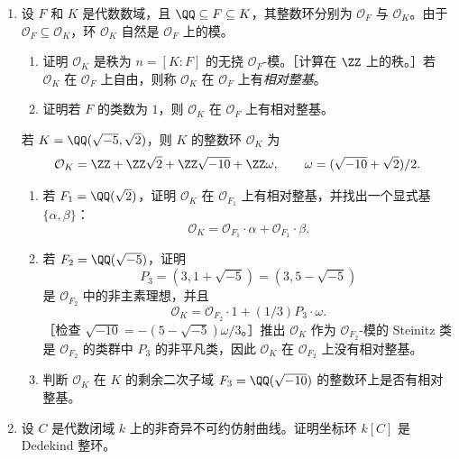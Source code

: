 \begin{enumerate}[label=\arabic*.]
\begin{enumerate}[label=(\alph*)]
    \item 证明 $\mathcal O$ 是 Bezout 整环（参见第 8.1 节）。
  \end{enumerate}
  \item 设 $F$ 和 $K$ 是代数数域，且 $\QQ\subseteq F\subseteq K$，其整数环分别为 $\mathcal O_F$ 与 $\mathcal O_K$。由于 $\mathcal O_F\subseteq\mathcal O_K$，环 $\mathcal O_K$ 自然是 $\mathcal O_F$ 上的模。
  \begin{enumerate}[label=(\alph*)]
    \item 证明 $\mathcal O_K$ 是秩为 $n=[K:F]$ 的无挠 $\mathcal O_F$-模。［计算在 $\ZZ$ 上的秩。］若 $\mathcal O_K$ 在 $\mathcal O_F$ 上自由，则称 $\mathcal O_K$ 在 $\mathcal O_F$ 上有\emph{相对整基}。
    \item 证明若 $F$ 的类数为 $1$，则 $\mathcal O_K$ 在 $\mathcal O_F$ 上有相对整基。
  \end{enumerate}
  若 $K=\QQ(\sqrt{-5},\sqrt2)$，则 $K$ 的整数环 $\mathcal O_K$ 为
  \[
    \mathcal O_K=\ZZ+\ZZ\sqrt2+\ZZ\sqrt{-10}+\ZZ\omega,
    \qquad
    \omega=(\sqrt{-10}+\sqrt2)/2.
  \]
  \begin{enumerate}[label=(\alph*),resume]
    \item 若 $F_1=\QQ(\sqrt2)$，证明 $\mathcal O_K$ 在 $\mathcal O_{F_1}$ 上有相对整基，并找出一个显式基 $\{\alpha,\beta\}$：
    \[
      \mathcal O_K=\mathcal O_{F_1}\cdot\alpha+\mathcal O_{F_1}\cdot\beta.
    \]
    \item 若 $F_2=\QQ(\sqrt{-5})$，证明
    \[
      P_3=(3,1+\sqrt{-5})=(3,5-\sqrt{-5})
    \]
    是 $\mathcal O_{F_2}$ 中的非主素理想，并且
    \[
      \mathcal O_K=\mathcal O_{F_2}\cdot1+(1/3)P_3\cdot\omega.
    \]
    ［检查 $\sqrt{-10}=-(5-\sqrt{-5})\omega/3$。］推出 $\mathcal O_K$ 作为 $\mathcal O_{F_2}$-模的 Steinitz 类是 $\mathcal O_{F_2}$ 的类群中 $P_3$ 的非平凡类，因此 $\mathcal O_K$ 在 $\mathcal O_{F_2}$ 上没有相对整基。
    \item 判断 $\mathcal O_K$ 在 $K$ 的剩余二次子域 $F_3=\QQ(\sqrt{-10})$ 的整数环上是否有相对整基。
  \end{enumerate}
  \item 设 $C$ 是代数闭域 $k$ 上的非奇异不可约仿射曲线。证明坐标环 $k[C]$ 是 Dedekind 整环。
\end{enumerate}
